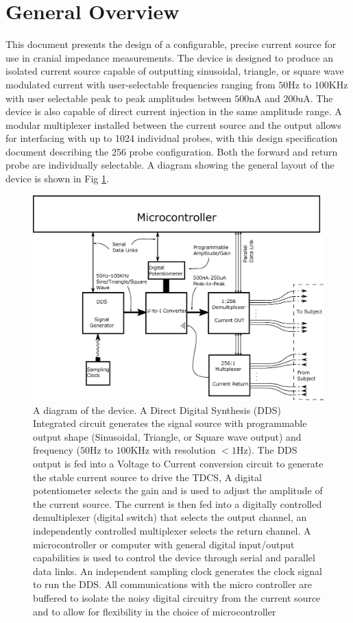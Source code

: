 \section{General Overview}

This document presents the design of a configurable, precise current source for use in cranial impedance measurements. The device is designed to produce an isolated current source capable of outputting sinusoidal, triangle, or square wave modulated current with user-selectable frequencies ranging from $50$Hz to $100$KHz with user selectable peak to peak amplitudes between $500$nA and $200$uA. The device is also capable of direct current injection in the same amplitude range. A modular multiplexer installed between the current source and the output allows for interfacing with up to 1024 individual probes, with this design specification document describing the 256 probe configuration. Both the forward and return probe are individually selectable. A diagram showing the general layout of the device is shown in Fig \ref{fig:generaldiagram}. 

\begin{figure}[!htb]
\centering
\includegraphics[width=\linewidth]{images/generaldiagram/current.eps}
\caption{A diagram of the device. A Direct Digital Synthesis (DDS) Integrated circuit generates the signal source with programmable output shape (Sinusoidal, Triangle, or Square wave output) and frequency ($50$Hz to $100$KHz with resolution $<1$Hz). The DDS output is fed into a Voltage to Current conversion circuit to generate the stable current source to drive the TDCS, A digital potentiometer selects the gain and is used to adjust the amplitude of the current source. The current is then fed into a digitally controlled demultiplexer (digital switch) that selects the output channel, an independently controlled multiplexer selects the return channel. A microcontroller or computer with general digital input/output capabilities is used to control the device through serial and parallel data links. An independent sampling clock generates the clock signal to run the DDS. All communications with the micro controller are buffered to isolate the noisy digital circuitry from the current source and to allow for flexibility in the choice of microcontroller}
\label{fig:generaldiagram}
\end{figure}

